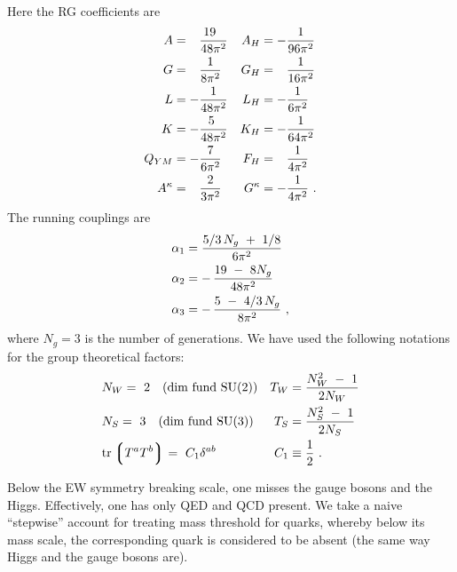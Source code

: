 	Here the RG coefficients are
%
\begin{align}
\notag
	A & = \phantom{-}\frac{19~\;}{48\pi^2}  & A_H      & = - \frac{1}{96\pi^2} \\
\notag
	G & = \phantom{-}\frac{1}{8\pi^2}     &	G_H 	 & = \phantom{-}
							\frac{1}{16\pi^2}	\\
\notag
	L & = - \frac{1}{48\pi^2}  	      &	L_H 	 & = - \frac{1}{6\pi^2}  \\
\notag
	K & = - \frac{5~}{48\pi^2}  	      &	K_H	 & = - \frac{1}{64\pi^2} \\
\notag
	Q_{YM} & =
		- \frac{7}{6\pi^2} 	      &	F_H & = \phantom{-}\frac{1}{4\pi^2} \\
\notag
	A^\kappa & = \phantom{-}
	          \frac{2}{3\pi^2} 	      &   G^\kappa & = - \frac{1}{4\pi^2} 
	~.
\end{align}
	The running couplings are
%
\begin{align}
\notag
	\alpha_1 & =        
			    \frac{5/3\, N_g ~+~ 1/8}
                                        {6\pi^2}  \\
\notag
	\alpha_2 & =    -\, \frac{19 ~-~ 8 N_g}
		                  {48\pi^2}  \\
\notag
	\alpha_3 & =    -\, \frac{5 ~-~4/3\, N_g}
			         {8\pi^2}~,
\end{align}
	where $ N_g = 3 $ is the number of generations.
	We have used the following notations for the group theoretical
	factors:
\begin{align}
\notag
	& N_W = ~2 \quad\text{(dim fund SU(2))} &
		T_W & = \frac{N_W^2 ~-~ 1}
			       {2 N_W}       
	\\
\notag
	& N_S = ~3 \quad\text{(dim fund SU(3))} &
		T_S & = \frac{N_S^2 ~-~ 1}
			       {2 N_S}
	\\
\notag
	& {\rm tr} \left\lgroup T^a T^b \right\rgroup = 
			~C_1 \delta^{ab} &
		C_1 & \equiv \frac{1}{2}~.
\end{align}

	Below the EW symmetry breaking scale, one misses the gauge bosons
	and the Higgs.
	Effectively, one has only QED and QCD present.
	We take a naive ``stepwise'' account for treating mass threshold for quarks,
	whereby below its mass scale, the corresponding quark is considered
	to be absent (the same way Higgs and the gauge bosons are).
	

